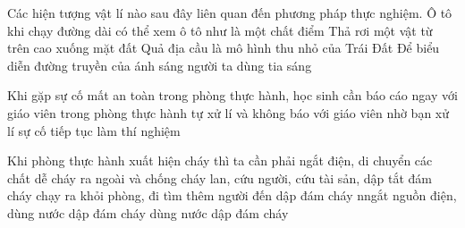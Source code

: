 \begin{ex} 
	Các hiện tượng vật lí nào sau đây liên quan đến phương pháp thực nghiệm.\choice
	{Ô tô khi chạy đường dài có thể xem ô tô như là một chất điểm}
	{\True Thả rơi một vật từ trên cao xuống mặt đất}
	{Quả địa cầu là mô hình thu nhỏ của Trái Đất}
	{Để biểu diễn đường truyền của ánh sáng người ta dùng tia sáng}
\end{ex}

\begin{ex} 
	Khi gặp sự cố mất an toàn trong phòng thực hành, học sinh cần \choice
	{\True báo cáo ngay với giáo viên trong phòng thực hành}
	{tự xử lí và không báo với giáo viên}
	{nhờ bạn xử lí sự cố}
	{tiếp tục làm thí nghiệm}
\end{ex}

\begin{ex} 
	Khi phòng thực hành xuất hiện cháy thì ta cần phải \choice
	{\True ngắt điện, di chuyển các chất dễ cháy ra ngoài và chống cháy lan, cứu người, cứu tài sản, dập tắt đám cháy}
	{chạy ra khỏi phòng, đi tìm thêm người đến dập đám cháy}
	{nngắt nguồn điện, dùng nước dập đám cháy}
	{dùng nước dập đám cháy}
\end{ex}
